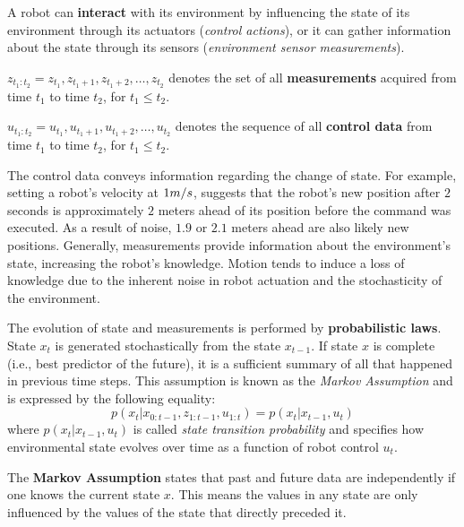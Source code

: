 A robot can \textbf{interact} with its environment by influencing the state of its environment through its actuators (\textit{control actions}), or it can gather information about the state through its sensors (\textit{environment sensor measurements}).
\begin{mydef}
$z_{t_1:t_2} = z_{t_1}, z_{t_1 + 1}, z_{t_1 + 2}, \hdots, z_{t_2}$ denotes the set of all \textbf{measurements} acquired from time $t_1$ to time $t_2$, for $t_1 \leq t_2$.
\end{mydef}
\begin{mydef}
$u_{t_1:t_2} = u_{t_1}, u_{t_1 + 1}, u_{t_1 + 2}, \hdots, u_{t_2}$ denotes the sequence of all \textbf{control data} from time $t_1$ to time $t_2$, for $t_1 \leq t_2$.
\end{mydef}
The control data conveys information regarding the change of state.
For example, setting a robot's velocity at $1 \small{m/s}$, suggests that the robot's new position after $2$ seconds is approximately $2$ meters ahead of its position before the command was executed.
As a result of noise, $1.9$ or $2.1$ meters ahead are also likely new positions.
Generally, measurements provide information about the environment's state, increasing the robot's knowledge.
Motion tends to induce a loss of knowledge due to the inherent noise in robot actuation and the stochasticity of the environment.

The evolution of state and measurements is performed by \textbf{probabilistic laws}.
State $x_t$ is generated stochastically from the state $x_{t-1}$.
If state $x$ is complete (i.e., best predictor of the future), it is a sufficient summary of all that happened in previous time steps.
This assumption is known as the \textit{Markov Assumption} and is expressed by the following equality:
\begin{equation}
\label{eq:background_state_trans_prob}
p(x_t | x_{0:t - 1}, z_{1:t - 1}, u_{1:t}) = p(x_t | x_{t-1}, u_t)
\end{equation}
where $p(x_t | x_{t-1}, u_t)$ is called \textit{state transition probability} and specifies how environmental state evolves over time as a function of robot control $u_t$.

\begin{mydef}
The \textbf{Markov Assumption} states that past and future data are independently if one knows the current state $x$. This means the values in any state are only influenced by the values of the state that directly preceded it.
\end{mydef}

